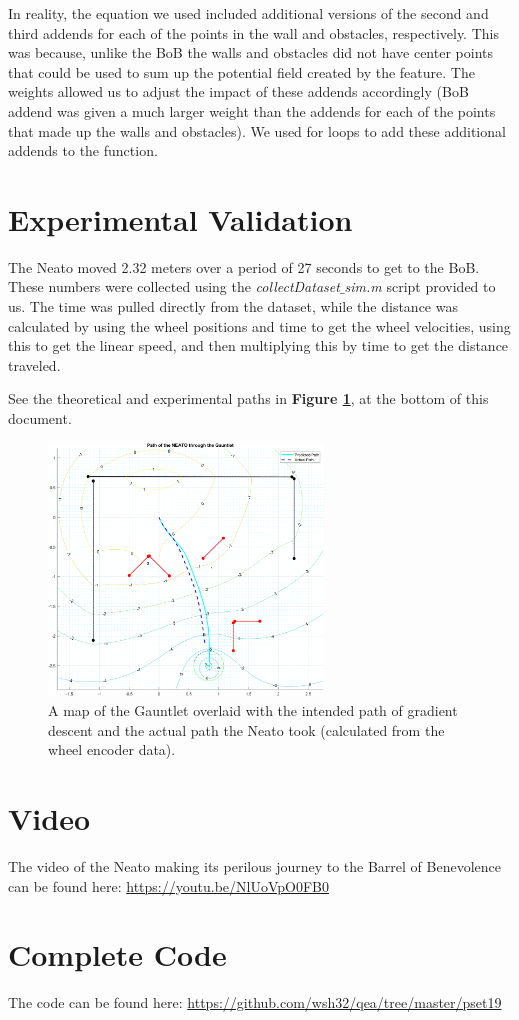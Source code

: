 In reality, the equation we used included additional versions of the second and third addends for each of the points in the wall and obstacles, respectively. This was because, unlike the BoB the walls and obstacles did not have center points that could be used to sum up the potential field created by the feature. The weights allowed us to adjust the impact of these addends accordingly (BoB addend was given a much larger weight than the addends for each of the points that made up the walls and obstacles). We used for loops to add these additional addends to the function.

\section{Experimental Validation}

The Neato moved 2.32 meters over a period of 27 seconds to get to the BoB. These numbers were collected using the \textit{collectDataset$\_$sim.m} script provided to us. The time was pulled directly from the dataset, while the distance was calculated by using the wheel positions and time to get the wheel velocities, using this to get the linear speed, and then multiplying this by time to get the distance traveled.

See the theoretical and experimental paths in \textbf{Figure \ref{fig:bothpaths}}, at the bottom of this document.

\begin{figure}[h]
    \centering
    \includegraphics[width=0.65\textwidth]{img/paths.png}
    \caption{A map of the Gauntlet overlaid with the intended path of gradient descent and the actual path the Neato took (calculated from the wheel encoder data).}
    \label{fig:bothpaths}
\end{figure}

\section{Video}
The video of the Neato making its perilous journey to the Barrel of Benevolence can be found here:
\url{https://youtu.be/NlUoVpO0FB0}

\section{Complete Code}
The code can be found here: \url{https://github.com/wsh32/qea/tree/master/pset19}


